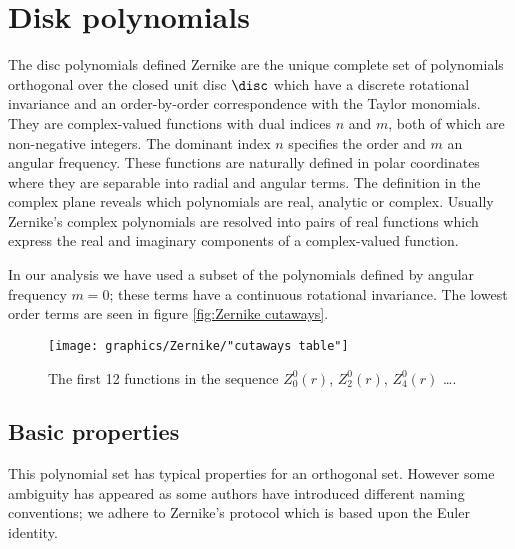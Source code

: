 \chapter{Disk polynomials}

The disc polynomials defined Zernike are the unique complete set of polynomials orthogonal over the closed unit disc $\disc$ which have a discrete rotational invariance and an order-by-order correspondence with the Taylor monomials. They are complex-valued functions with dual indices $n$ and $m$, both of which are non-negative integers. The dominant index $n$ specifies the order and $m$ an angular frequency. These functions are naturally defined in polar coordinates where they are separable into radial and angular terms. The definition in the complex plane reveals which polynomials are real, analytic or complex. Usually Zernike's complex polynomials are resolved into pairs of real functions which express the real and imaginary components of a complex-valued function.

In our analysis we have used a subset of the polynomials defined by angular frequency $m=0$; these terms have a continuous rotational invariance. The lowest order terms are seen in figure \eqref{fig:Zernike cutaways}.

\begin{figure}[htbp] %
   \centering
   \texttt{[image: graphics/Zernike/"cutaways table"]} 
   \caption{The first 12 functions in the sequence $Z_{0}^{0}(r)$, $Z_{2}^{0}(r)$, $Z_{4}^{0}(r)$ \dots .}
   \label{fig:Zernike cutaways}
\end{figure}

\section{Basic properties}
This polynomial set has typical properties for an orthogonal set. However some ambiguity has appeared as some authors have introduced different naming conventions; we adhere to Zernike's protocol which is based upon the Euler identity.
 
